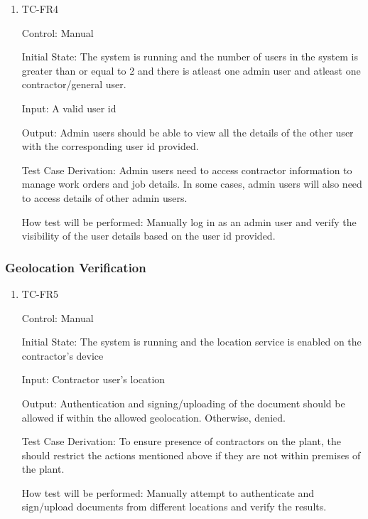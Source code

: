 \documentclass[12pt, titlepage]{article}
\begin{document}
\begin{enumerate}
  \item {TC-FR4\\}

    Control: Manual

    Initial State: The system is running and the number of users in the system
    is greater than or equal to 2 and there is atleast one admin user and
    atleast one contractor/general user.

    Input: A valid user id

    Output: Admin users should be able to view all the details of the other user
    with the corresponding user id provided.

    Test Case Derivation: Admin users need to access contractor information to
    manage work orders and job details. In some cases, admin users will also
    need to access details of other admin users.

    How test will be performed: Manually log in as an admin user and verify the
    visibility of the user details based on the user id provided.

\end{enumerate}

\subsubsection{Geolocation Verification}

\begin{enumerate}
  \item {TC-FR5\\}

    Control: Manual

    Initial State: The system is running and the location service is enabled
    on the contractor's device

    Input: Contractor user's location

    Output: Authentication and signing/uploading of the document should be
    allowed if within the allowed geolocation. Otherwise, denied.

    Test Case Derivation: To ensure presence of contractors on the plant, the
    should restrict the actions mentioned above if they are not within premises
    of the plant.

    How test will be performed: Manually attempt to authenticate and sign/upload
    documents from different locations and verify the results.

\end{enumerate}
\end{document}

